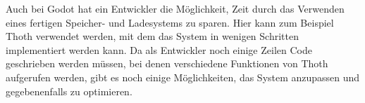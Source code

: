 Auch bei Godot hat ein Entwickler die Möglichkeit, Zeit durch das Verwenden eines fertigen Speicher- und Ladesystems zu sparen. Hier kann zum Beispiel Thoth verwendet werden, mit dem das System in wenigen Schritten implementiert werden kann. Da als Entwickler noch einige Zeilen Code geschrieben werden müssen, bei denen verschiedene Funktionen von Thoth aufgerufen werden, gibt es noch einige Möglichkeiten, das System anzupassen und gegebenenfalls zu optimieren.